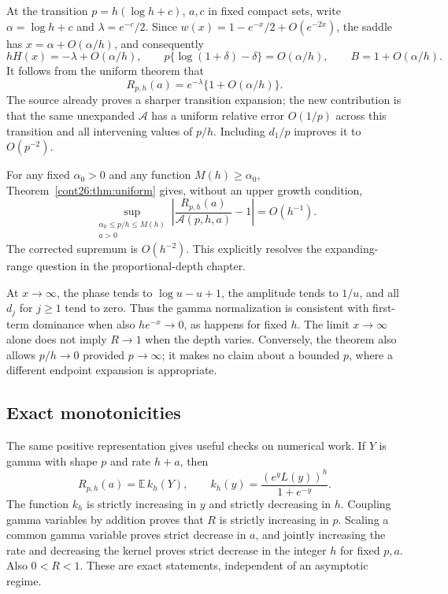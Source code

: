 At the transition $p=h(\log h+c)$, $a,c$ in fixed compact sets,
write $\alpha=\log h+c$ and $\lambda=e^{-c}/2$.
Since $w(x)=1-e^{-x}/2+O(e^{-2x})$, the saddle has
$x=\alpha+O(\alpha/h)$, and consequently
\[
 hH(x)=-\lambda+O(\alpha/h),\qquad
 p\{\log(1+\delta)-\delta\}=O(\alpha/h),\qquad
 B=1+O(\alpha/h).
\]
It follows from the uniform theorem that
\[
 R_{p,h}(a)=e^{-\lambda}\{1+O(\alpha/h)\}.
\]
The source already proves a sharper transition expansion; the new
contribution is that the same unexpanded $\mathcal A$ has a uniform
relative error $O(1/p)$ across this transition and all intervening
values of $p/h$. Including $d_1/p$ improves it to $O(p^{-2})$.

For any fixed $\alpha_0>0$ and any function $M(h)\geq\alpha_0$,
Theorem~\ref{cont26:thm:uniform} gives, without an upper growth condition,
\begin{equation}\label{cont26:eq:expanding-range}
 \sup_{\substack{\alpha_0\leq p/h\leq M(h)\\a>0}}
 \left|\frac{R_{p,h}(a)}{\mathcal A(p,h,a)}-1\right|=O(h^{-1}).
\end{equation}
The corrected supremum is $O(h^{-2})$. This explicitly resolves the
expanding-range question in the proportional-depth chapter.

At $x\to\infty$, the phase tends to $\log u-u+1$, the amplitude
tends to $1/u$, and all $d_j$ for $j\geq1$ tend to zero. Thus the
gamma normalization is consistent with first-term dominance when also
$h e^{-x}\to0$, as happens for fixed $h$. The limit $x\to\infty$
alone does not imply $R\to1$ when the depth varies. Conversely,
the theorem also allows $p/h\to0$ provided $p\to\infty$; it makes
no claim about a bounded $p$, where a different endpoint expansion is
appropriate.

\subsection{Exact monotonicities}
The same positive representation gives useful checks on numerical work.
If $Y$ is gamma with shape $p$ and rate $h+a$, then
\[
 R_{p,h}(a)=\mathbb E\,k_h(Y),\qquad
 k_h(y)=\frac{(e^yL(y))^h}{1+e^{-y}}.
\]
The function $k_h$ is strictly increasing in $y$ and strictly decreasing
in $h$. Coupling gamma variables by addition proves that $R$ is strictly
increasing in $p$. Scaling a common gamma variable proves strict decrease
in $a$, and jointly increasing the rate and decreasing the kernel proves
strict decrease in the integer $h$ for fixed $p,a$. Also $0<R<1$.
These are exact statements, independent of an asymptotic regime.


